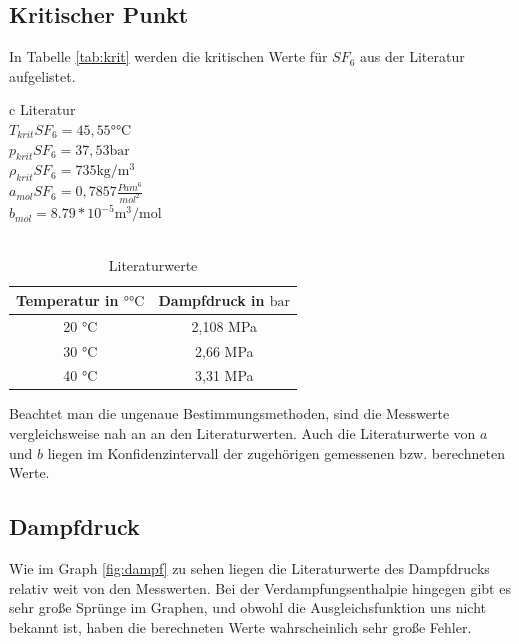 \documentclass[11pt, a4paper]{article}
\begin{document}
    \subsection{Kritischer Punkt}
    In Tabelle \ref{tab:krit} werden die kritischen Werte für $SF_6$ aus der Literatur aufgelistet.
    \begin{table}[H]
        \centering
        \begin{tabular}{c}
            Literatur \\ \hline
            $T_{krit} SF_6 = 45,55 \si{\degree \celsius}$ \cite{SH6} \\
            $p_{krit} SF_6 = 37,53 \si{\bar}$ \cite{SH6} \\
            $\rho_{krit} SF_6 = 735 \si{\kilogram \per \meter \cubed}$ \cite{SH6} \\
            $a_{mol} SF_6= 0,7857 \frac{Pa m^6}{mol^2}$ \cite{Theo}\\
            $b_{mol} = 8.79*10^{-5}\si{\cubic\metre\per\mol}$\cite{Theo}\\
            \\
            \begin{tabular}{c c}
                Temperatur in $\si{\degree\celsius}$ & Dampfdruck in $\si{\bar}$ \\ \hline
                20 \si{\celsius} & 2,108 \si{\mega\pascal} \\
                30 \si{\celsius} & 2,66 \si{\mega\pascal} \\
                40 \si{\celsius} & 3,31 \si{\mega\pascal} \\
            \end{tabular}
        \end{tabular}
        \caption{Literaturwerte}
        \label{tab:literaturwerte}
    \end{table}
    Beachtet man die ungenaue Bestimmungsmethoden, sind die Messwerte vergleichsweise nah an an den Literaturwerten. 
    Auch die Literaturwerte von $a$ und $b$ liegen im Konfidenzintervall der zugehörigen gemessenen bzw. berechneten Werte. 

    \subsection{Dampfdruck}
    Wie im Graph \ref{fig:dampf} zu sehen liegen die Literaturwerte des Dampfdrucks relativ weit von den Messwerten.
    Bei der Verdampfungsenthalpie hingegen gibt es sehr große Sprünge im Graphen, und obwohl die Ausgleichsfunktion
    uns nicht bekannt ist, haben die berechneten Werte wahrscheinlich sehr große Fehler.
\end{document}
